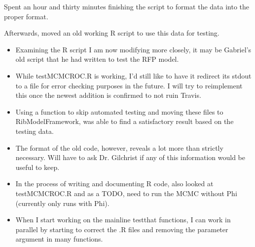 \documentclass[12pt,hyperref]{labbook}
\begin{document}

Spent an hour and thirty minutes finishing the script to format the data into the proper format.

Afterwards, moved an old working R script to use this data for testing.


\begin{itemize}
    \item Examining the R script I am now modifying more closely, it may be Gabriel's old script that he had written to test the RFP model.
    \item While testMCMCROC.R is working, I'd still like to have it redirect its stdout to a file for error checking purposes in the future.
    I will try to reimplement this once the newest addition is confirmed to not ruin Travis.
    \item Using a function to skip automated testing and moving these files to RibModelFramework, was able to find a satisfactory result based on the testing data.
    \item The format of the old code, however, reveals a lot more than strictly necessary.
    Will have to ask Dr. Gilchrist if any of this information would be useful to keep.
    \item In the process of writing and documenting R code, also looked at testMCMCROC.R and as a TODO, need to run the MCMC without Phi (currently only runs with Phi).
    \item When I start working on the mainline testthat functions, I can work in parallel by starting to correct the .R files and removing the parameter argument in many functions.
\end{itemize}

\end{document}
